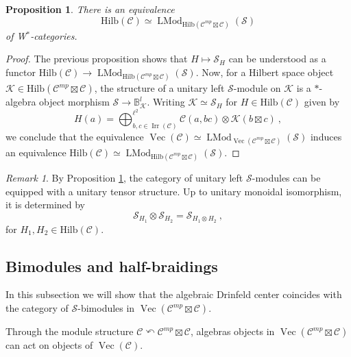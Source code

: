 \documentclass[a4paper,11pt,reqno]{amsart}
\numberwithin{equation}{section}
\newtheorem{proposition}[theorem]{Proposition}
\theoremstyle{remark}
\newtheorem{remark}[theorem]{Remark}
\theoremstyle{definition}
\newcommand{\bB}{\mathbb B}
\newcommand{\cC}{\mathcal C}
\newcommand{\cK}{\mathcal K}
\newcommand{\cS}{\mathcal S}
\DeclareMathOperator{\Irr}{Irr}
\DeclareMathOperator{\Vect}{Vec}
\DeclareMathOperator{\LMod}{LMod}
\newcommand{\Hilb}{\mathrm{Hilb}}
\begin{document}
\begin{proposition}
	There is an equivalence
	\[ 
	\Hilb(\cC) \simeq \LMod_{\Hilb(\cC^{mp} \boxtimes \cC)} (\cS) 
	 \]
	 of W$^*$-categories.
	 \label{prop:Hilb(C)simequnitaryleftSmodules}
\end{proposition}
\begin{proof}
	The previous proposition shows that $H \mapsto \cS_H$ can be understood as a functor $\Hilb(\cC) \to \LMod_{\Hilb(\cC^{mp} \boxtimes \cC)}(\cS)$. Now, for a Hilbert space object $\cK \in \Hilb(\cC^{mp} \boxtimes \cC)$, the structure of a unitary left $\cS$-module on $\cK$ is a $*$-algebra object morphism $\cS \to \bB^l_{\cK}$. Writing $\cK \simeq \cS_H$ for $H \in \Hilb(\cC)$ given by
	\[ H(a)  = \bigoplus_{b,c \in \Irr(\cC)}^{\ell^2} \cC(a,bc) \otimes \cK(b \boxtimes c) \ , \]
	we conclude that the equivalence $\Vect(\cC) \simeq \LMod_{\Vect(\cC^{mp} \boxtimes \cC)}(\cS)$ induces an equivalence $\Hilb(\cC) \simeq \LMod_{\Hilb(\cC^{mp} \boxtimes \cC)} (\cS)$.
\end{proof}


\begin{remark}
	By Proposition \ref{prop:Hilb(C)simequnitaryleftSmodules}, the category of unitary left $\cS$-modules can be equipped with a unitary tensor structure. Up to unitary monoidal isomorphism, it is determined by
	\[\cS_{H_1} \otimes \cS_{H_2} = \cS_{H_1 \otimes H_2} \ ,
	\]
	for $H_1,H_2 \in \Hilb(\cC)$.
\end{remark}

\bigskip









\subsection{Bimodules and half-braidings}

In this subsection we will show that the algebraic Drinfeld center coincides with the category of $\cS$-bimodules in $\Vect(\cC^{mp} \boxtimes \cC)$.
\medskip

Through the module structure $\cC \curvearrowleft \cC^{mp} \boxtimes \cC$, algebras objects in $\Vect(\cC^{mp} \boxtimes \cC)$ can act on objects of $\Vect(\cC)$.
\end{document}

